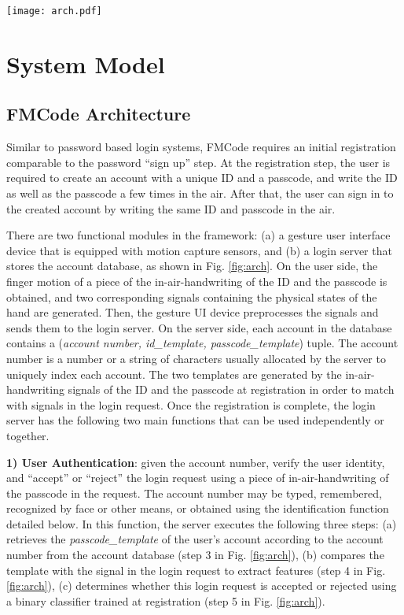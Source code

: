 \documentclass[conference]{IEEEtran}
\begin{document}
\begin{figure*}[t]
\centering
\texttt{[image: arch.pdf]}
\vspace{-4.0in}
\caption{System Architecture and Procedures.}
\label{fig:arch}
\end{figure*}


\section{System Model}

\subsection{FMCode Architecture}

Similar to password based login systems, FMCode requires an initial registration comparable to the password ``sign up'' step. At the registration step, the user is required to create an account with a unique ID and a passcode, and write the ID as well as the passcode a few times in the air. After that, the user can sign in to the created account by writing the same ID and passcode in the air.

There are two functional modules in the framework: (a) a gesture user interface device that is equipped with motion capture sensors, and (b) a login server that stores the account database, as shown in Fig. \ref{fig:arch}. On the user side, the finger motion of a piece of the in-air-handwriting of the ID and the passcode is obtained, and two corresponding signals containing the physical states of the hand are generated. Then, the gesture UI device preprocesses the signals and sends them to the login server. On the server side, each account in the database contains a (\textit{account number, id\_template, passcode\_template}) tuple. The account number is a number or a string of characters usually allocated by the server to uniquely index each account. The two templates are generated by the in-air-handwriting signals of the ID and the passcode at registration in order to match with signals in the login request. Once the registration is complete, the login server has the following two main functions that can be used independently or together.

\textbf{1) User Authentication}: given the account number, verify the user identity, and ``accept'' or ``reject'' the login request using a piece of in-air-handwriting of the passcode in the request. The account number may be typed, remembered, recognized by face or other means, or obtained using the identification function detailed below. In this function, the server executes the following three steps: (a) retrieves the \textit{passcode\_template} of the user's account according to the account number from the account database (step 3 in Fig. \ref{fig:arch}), (b) compares the template with the signal in the login request to extract features (step 4 in Fig. \ref{fig:arch}), (c) determines whether this login request is accepted or rejected using a binary classifier trained at registration (step 5 in Fig. \ref{fig:arch}).  
\end{document}
